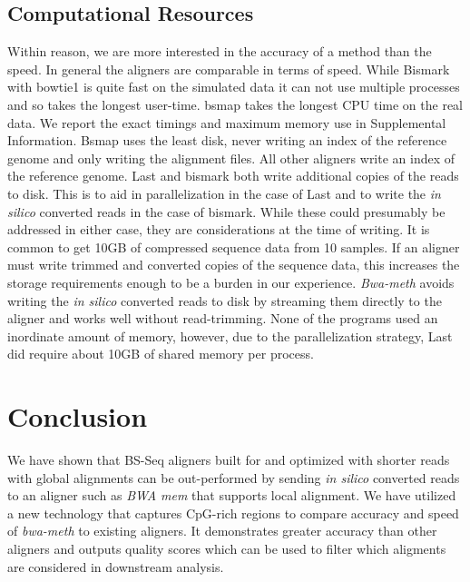 \documentclass{bioinfo}
\begin{document}
\subsection{Computational Resources}
Within reason, we are more interested in the accuracy of a
method than the speed. In general the aligners are comparable in terms of
speed. While Bismark with bowtie1 is quite fast on the simulated data it
can not use multiple processes and so takes the longest user-time. bsmap
takes the longest CPU time on the real data. We report the exact 
timings and maximum memory use in Supplemental Information.
Bsmap uses the least disk, never writing an index of the reference genome
and only writing the alignment files. All other aligners write an index of
the reference genome. Last and bismark both write additional copies of the
reads to disk. This is to aid in parallelization in the case of Last and to
write the \emph{in silico} converted reads in the case of bismark. While
these could presumably be addressed in either case, they are considerations
at the time of writing. It is common to get 10GB of compressed sequence data
from 10 samples. If an aligner must write trimmed and converted copies of the
sequence data, this increases the storage requirements enough to be a
burden in our experience. \textit{Bwa-meth} avoids writing the \emph{in silico}
converted reads to disk by streaming them directly to the aligner and works
well without read-trimming.
None of the programs used an inordinate amount of memory, however, due to
the parallelization strategy, Last did require about 10GB of shared memory
per process.

%
%

\section{Conclusion}
We have shown that BS-Seq aligners built for and optimized with shorter reads
with global alignments can be out-performed by sending \emph{in silico}
converted reads to an aligner such as \textit{BWA mem} \citep{bwamem} that supports
local alignment.
We have utilized a new technology that captures CpG-rich regions to compare
accuracy and speed of \textit{bwa-meth} to existing aligners.
It demonstrates greater accuracy than other aligners and outputs quality
scores which can be used to filter which aligments are considered in
downstream analysis.
\end{document}
